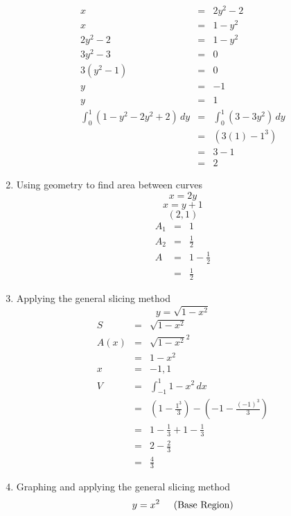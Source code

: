 \documentclass{article}
\begin{document}
\begin{enumerate}
\begin{eqnarray}
            x &=& 2y^2 - 2 \\
            x &=& 1 - y^2 \\
            2y^2 - 2 &=& 1 - y^2 \\
            3y^2 - 3 &=& 0 \\
            3\left(y^2 - 1\right) &=& 0 \\
            y &=& -1 \\
            y &=& 1 \\
            \int_0^1{\left(1 - y^2 - 2y^2 + 2\right)\,dy} &=& \int_0^1{\left(3 - 3y^2\right)\,dy} \\
                                                             &=& \left(3(1) - 1^3\right) \\
                                                             &=& 3 - 1 \\
                                                             &=& 2
        \end{eqnarray}
    \item Using geometry to find area between curves
        $$x = 2y$$
        $$x = y + 1$$
        $$(2,1)$$
        \begin{eqnarray}
            A_1 &=& 1 \\
            A_2 &=& \frac{1}{2} \\
            A &=& 1 - \frac{1}{2} \\
              &=& \frac{1}{2}
        \end{eqnarray}
    \item Applying the general slicing method
        $$y = \sqrt{1 - x^2}$$
        \begin{eqnarray}
            S &=& \sqrt{1 - x^2} \\
            A(x) &=& \sqrt{1 - x^2}^2 \\
                 &=& 1 - x^2 \\
            x &=& -1, 1 \\
            V &=& \int_{-1}^1{1 - x^2\,dx} \\
              &=& \left(1 - \frac{1^3}{3}\right) - \left(-1 - \frac{(-1)^3}{3}\right) \\
              &=& 1 - \frac{1}{3} + 1 - \frac{1}{3} \\
              &=& 2 - \frac{2}{3} \\
              &=& \frac{4}{3}
        \end{eqnarray}
    \item Graphing and applying the general slicing method
        $$y = x^2 \hspace{0.5cm} \text{(Base Region)}$$

\end{enumerate}
\end{document}
